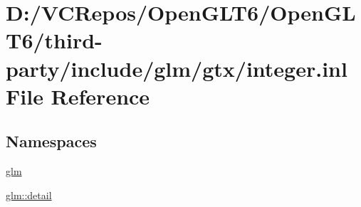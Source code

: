 \hypertarget{gtx_2integer_8inl}{}\section{D\+:/\+V\+C\+Repos/\+Open\+G\+L\+T6/\+Open\+G\+L\+T6/third-\/party/include/glm/gtx/integer.inl File Reference}
\label{gtx_2integer_8inl}
\subsection*{Namespaces}
\begin{DoxyCompactItemize}
\item 
 \mbox{\hyperlink{namespaceglm}{glm}}
\item 
 \mbox{\hyperlink{namespaceglm_1_1detail}{glm\+::detail}}
\end{DoxyCompactItemize}
